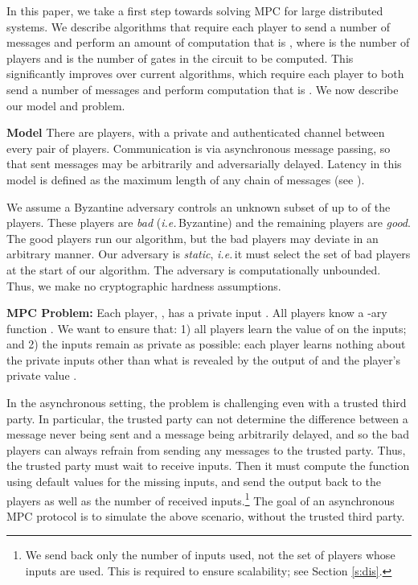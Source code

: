 \documentclass[10pt]{llncs}
\newcommand{\parasec}[1]{\vspace{8px}\noindent\textbf{#1}\hspace{5px}}
\newcommand{\ie}{\emph{i.e.\,}}
\begin{document}
In this paper, we take a first step towards solving MPC for large distributed systems.  We describe algorithms that require each player to send a number of messages and perform an
amount of computation that is , where  is the number of players and  is the number of gates in the circuit to be computed. This significantly improves over current algorithms, which require each player to both send a number of messages and perform computation that
is .  We now describe our model and problem.
 
\parasec{Model} There are  players, with a private and authenticated channel between every pair of players.  Communication is via asynchronous message passing, so that sent messages may be arbitrarily and adversarially delayed. Latency in this model is defined as the maximum length of any chain of messages (see \cite{CD,AW}). 

We assume a Byzantine adversary controls an unknown subset of up to  of the players.  These players are \emph{bad} (\ie Byzantine) and the remaining
players are \emph{good}. The good players run our algorithm, but the bad players may deviate in an arbitrary manner.  Our adversary is \emph{static}, \ie it must select the set of bad players at the start of our algorithm.  The adversary is computationally unbounded. Thus, we make no cryptographic hardness assumptions.

\smallskip
\noindent
{\bf MPC Problem:} Each player, , has a private input .  All players know a -ary function .  We want to ensure that: 1) all players learn the value of  on the inputs; and 2) the inputs remain as private as possible: each player  learns nothing about the private inputs other than what is revealed by the output of  and the player's private value .

In the asynchronous setting, the problem is challenging even with a
trusted third party.   In particular, the trusted party can not determine the difference between a message never being sent and a message being arbitrarily delayed, and so the  bad players can always refrain from sending any messages to the trusted party.   Thus, the trusted party must wait to receive  inputs.  Then it must compute the function  using default values for the missing inputs, and send the output  back to the players as well as the number of received inputs.\footnote{We send back only the number of inputs used, not the set of players whose inputs are used. This is required to ensure scalability; see Section \ref{s:dis}.}  The goal of an asynchronous MPC protocol is to
simulate the above scenario, without the trusted third party. 
\end{document}
